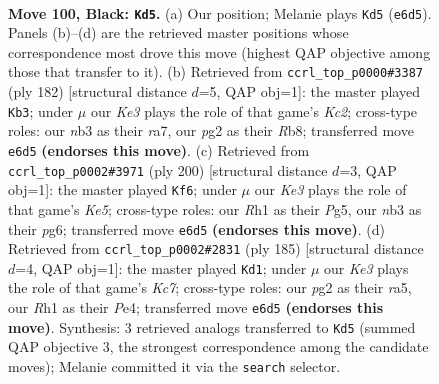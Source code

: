\documentclass[11pt]{article}
\begin{document}
\clearpage

\begin{figure}[p]\centering
\begin{subfigure}{0.46\textwidth}\centering
\resizebox{\linewidth}{!}{%
\newchessgame
\chessboard[
  setfen={8/2R5/4k3/8/5K2/1N6/6P1/7r b - - 65 100},
  showmover=false,
  pgfstyle=straightmove, color=movearrow, markmove={e6-d5}
]}
\caption{}
\end{subfigure}\hfill
\begin{subfigure}{0.46\textwidth}\centering
\resizebox{\linewidth}{!}{%
\newchessgame
\chessboard[
  setfen={1R6/r7/3r4/8/7R/8/2K3k1/8 w - - 18 92},
  showmover=false,
  pgfstyle=straightmove, color=movearrow, markmove={c2-b3}
]}
\caption{}
\end{subfigure}
\\[4pt]
\begin{subfigure}{0.46\textwidth}\centering
\resizebox{\linewidth}{!}{%
\newchessgame
\chessboard[
  setfen={6k1/2R5/6p1/4K1P1/7r/8/8/8 w - - 2 101},
  showmover=false,
  pgfstyle=straightmove, color=movearrow, markmove={e5-f6}
]}
\caption{}
\end{subfigure}\hfill
\begin{subfigure}{0.46\textwidth}\centering
\resizebox{\linewidth}{!}{%
\newchessgame
\chessboard[
  setfen={8/7r/8/R7/4p3/4P3/2k3K1/8 b - - 7 93},
  showmover=false,
  pgfstyle=straightmove, color=movearrow, markmove={c2-d1}
]}
\caption{}
\end{subfigure}
\caption{\textbf{Move 100, Black: \texttt{Kd5}.} (a) Our position; Melanie plays \texttt{Kd5} (\texttt{e6d5}). Panels (b)--(d) are the retrieved master positions whose correspondence most drove this move (highest QAP objective among those that transfer to it). (b) Retrieved from \texttt{ccrl\_top\_p0000\#3387} (ply 182) [structural distance $d$=5, QAP obj=1]: the master played \texttt{Kb3}; under $\mu$ our \emph{Ke3} plays the role of that game's \emph{Kc2}; cross-type roles: our \emph{n}b3 as their \emph{r}a7, our \emph{p}g2 as their \emph{R}b8; transferred move \texttt{e6d5} \textbf{(endorses this move)}. (c) Retrieved from \texttt{ccrl\_top\_p0002\#3971} (ply 200) [structural distance $d$=3, QAP obj=1]: the master played \texttt{Kf6}; under $\mu$ our \emph{Ke3} plays the role of that game's \emph{Ke5}; cross-type roles: our \emph{R}h1 as their \emph{P}g5, our \emph{n}b3 as their \emph{p}g6; transferred move \texttt{e6d5} \textbf{(endorses this move)}. (d) Retrieved from \texttt{ccrl\_top\_p0002\#2831} (ply 185) [structural distance $d$=4, QAP obj=1]: the master played \texttt{Kd1}; under $\mu$ our \emph{Ke3} plays the role of that game's \emph{Kc7}; cross-type roles: our \emph{p}g2 as their \emph{r}a5, our \emph{R}h1 as their \emph{P}e4; transferred move \texttt{e6d5} \textbf{(endorses this move)}. Synthesis: 3 retrieved analogs transferred to \texttt{Kd5} (summed QAP objective 3, the strongest correspondence among the candidate moves); Melanie committed it via the \texttt{search} selector.}
\label{fig:thought-m199}
\end{figure}
\end{document}
